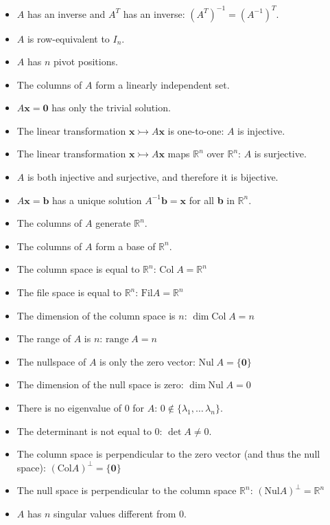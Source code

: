 \documentclass[12pt]{article}
\newcommand{\R}{\mathbb{R}}
\newcommand{\bt}[1]{\textbf{{#1}}}
\newcommand{\bm}[1]{\mathbf{{#1}}}
\newcommand{\set}[1]{\{{#1}\}}
\begin{document}
\begin{itemize}
    \item $A$ has an inverse and $A^T$ has an inverse: $(A^T)^{-1} =(A^{-1})^T$.
    \item $A$ is row-equivalent to $I_{n}$.
    \item $A$ has $n$ pivot positions.
    \item The columns of $A$ form a linearly independent set.
    \item $A\bm{x} = \bm{0}$ has only the trivial solution.
    \item The linear transformation $\bm{x} \rightarrowtail A\bm{x}$ is one-to-one: $A$ is injective.
    \item The linear transformation $\bm{x} \rightarrowtail A\bm{x}$ maps $\R^n$ over $\R^n$: $A$ is surjective.
    \item $A$ is both injective and surjective, and therefore it is bijective.
    \item $A\bm{x} = \bm{b}$ has a unique solution $A^{-1}\bm{b}= \bm{x}$ for all \bt{b} in $\R^n$.
    \item The columns of $A$ generate $\R^n$.
    \item The columns of $A$ form a base of $\R^n$.
    \item The column space is equal to $\R^n$: $\textrm{Col}\; A = \R^n$
    \item The file space is equal to $\R^n$: $\textrm{Fil}A = \R^n$
    \item The dimension of the column space is $n$: $\dim \textrm{Col}\; A = n$
    \item The range of $A$ is $n$: $\textrm{range}\; A = n$
    \item The nullspace of $A$ is only the zero vector: $\textrm{Nul}\; A = \set{\bm{0}}$
    \item The dimension of the null space is zero: $\dim \textrm{Nul}\; A = 0$
    \item There is no eigenvalue of $0$ for $A$: $0 \notin \set{\lambda_1,\dots\,\lambda_n}$.
    \item The determinant is not equal to $0$: $\det A \neq 0$.
    \item The column space is perpendicular to the zero vector (and thus the null space): $(\textrm{Col}A)^\perp = \set{\bm{0}}$
    \item The null space is perpendicular to the column space $\R^n$: $(\textrm{Nul}A)^\perp = \R^n$
    \item $A$ has $n$ singular values different from $0$.
\end{itemize}
\end{document}
